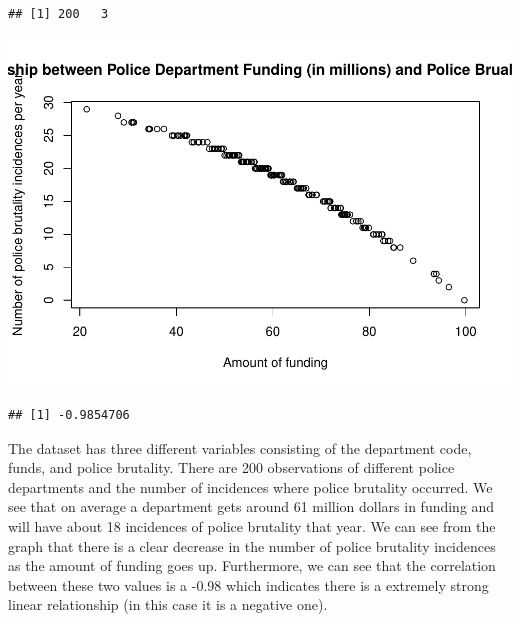 \documentclass[
]{article}
\newenvironment{Shaded}{\begin{snugshade}}{\end{snugshade}}
\newcommand{\AttributeTok}[1]{\textcolor[rgb]{0.77,0.63,0.00}{#1}}
\newcommand{\FunctionTok}[1]{\textcolor[rgb]{0.00,0.00,0.00}{#1}}
\newcommand{\NormalTok}[1]{#1}
\newcommand{\SpecialCharTok}[1]{\textcolor[rgb]{0.00,0.00,0.00}{#1}}
\newcommand{\StringTok}[1]{\textcolor[rgb]{0.31,0.60,0.02}{#1}}
\begin{document}
\begin{verbatim}
## [1] 200   3
\end{verbatim}

\begin{Shaded}
\end{Shaded}

\includegraphics{Journal_files/figure-latex/unnamed-chunk-31-1.pdf}

\begin{Shaded}
\end{Shaded}

\begin{verbatim}
## [1] -0.9854706
\end{verbatim}

The dataset has three different variables consisting of the department
code, funds, and police brutality. There are 200 observations of
different police departments and the number of incidences where police
brutality occurred. We see that on average a department gets around 61
million dollars in funding and will have about 18 incidences of police
brutality that year. We can see from the graph that there is a clear
decrease in the number of police brutality incidences as the amount of
funding goes up. Furthermore, we can see that the correlation between
these two values is a -0.98 which indicates there is a extremely strong
linear relationship (in this case it is a negative one).
\end{document}
